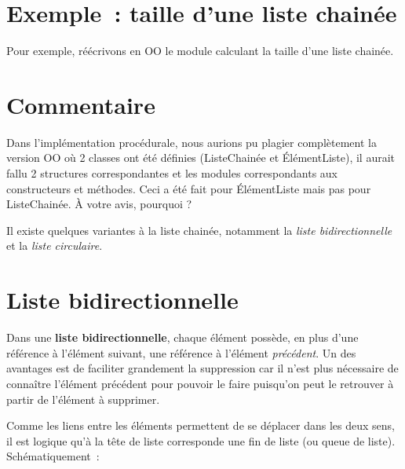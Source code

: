 \section{Exemple~: taille d'une liste chainée}

	Pour exemple, réécrivons en OO le module calculant la taille d'une liste chainée.



\section{Commentaire}

	Dans l'implémentation procédurale, nous aurions pu plagier complètement 
	la version OO où 2 classes ont été définies (ListeChainée et ÉlémentListe), 
	il aurait fallu 2 structures correspondantes et les modules correspondants 
	aux constructeurs et méthodes. Ceci a été fait pour ÉlémentListe mais pas 
	pour ListeChainée. À votre avis, pourquoi ?

	Il existe quelques variantes à la liste chainée, notamment la 
	\textit{liste bidirectionnelle} et la \textit{liste circulaire}.


\section{Liste bidirectionnelle}

	Dans une \textbf{liste bidirectionnelle}, chaque élément possède, 
	en plus d'une référence à l'élément suivant,
	une référence à l'élément \textit{précédent}. Un des avantages est 
	de faciliter grandement la suppression car il n'est
	plus nécessaire de connaître l'élément précédent pour pouvoir le faire 
	puisqu'on peut le retrouver à partir de
	l'élément à supprimer.

	Comme les liens entre les éléments permettent de se déplacer 
	dans les deux sens, il est logique qu'à la tête de liste
	corresponde une fin de liste (ou queue de liste). Schématiquement~:

